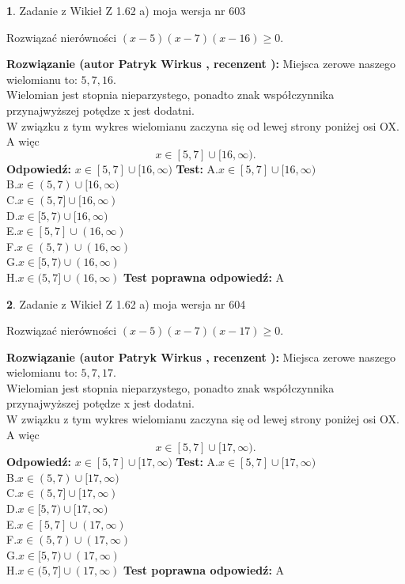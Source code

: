 \documentclass[12pt, a4paper]{article}
\theoremstyle{definition} %
\newtheorem{zad}{}
\newcommand{\zadStart}[1]{\begin{zad}#1\newline}
\newcommand{\zadStop}{\end{zad}}
\newcommand{\rozwStart}[2]{\noindent \textbf{Rozwiązanie (autor #1 , recenzent #2): }\newline}
\newcommand{\rozwStop}{\newline}
\newcommand{\odpStart}{\noindent \textbf{Odpowiedź:}\newline}
\newcommand{\odpStop}{\newline}
\newcommand{\testStart}{\noindent \textbf{Test:}\newline}
\newcommand{\testStop}{\newline}
\newcommand{\kluczStart}{\noindent \textbf{Test poprawna odpowiedź:}\newline}
\newcommand{\kluczStop}{\newline}
\begin{document}
\zadStart{Zadanie z Wikieł Z 1.62 a) moja wersja nr 603}

Rozwiązać nierówności $(x-5)(x-7)(x-16)\ge0$.
\zadStop
\rozwStart{Patryk Wirkus}{}
Miejsca zerowe naszego wielomianu to: $5, 7, 16$.\\
Wielomian jest stopnia nieparzystego, ponadto znak współczynnika przy\linebreak najwyższej potędze x jest dodatni.\\ W związku z tym wykres wielomianu zaczyna się od lewej strony poniżej osi OX. A więc $$x \in [5,7] \cup [16,\infty).$$
\rozwStop
\odpStart
$x \in [5,7] \cup [16,\infty)$
\odpStop
\testStart
A.$x \in [5,7] \cup [16,\infty)$\\
B.$x \in (5,7) \cup [16,\infty)$\\
C.$x \in (5,7] \cup [16,\infty)$\\
D.$x \in [5,7) \cup [16,\infty)$\\
E.$x \in [5,7] \cup (16,\infty)$\\
F.$x \in (5,7) \cup (16,\infty)$\\
G.$x \in [5,7) \cup (16,\infty)$\\
H.$x \in (5,7] \cup (16,\infty)$
\testStop
\kluczStart
A
\kluczStop



\zadStart{Zadanie z Wikieł Z 1.62 a) moja wersja nr 604}

Rozwiązać nierówności $(x-5)(x-7)(x-17)\ge0$.
\zadStop
\rozwStart{Patryk Wirkus}{}
Miejsca zerowe naszego wielomianu to: $5, 7, 17$.\\
Wielomian jest stopnia nieparzystego, ponadto znak współczynnika przy\linebreak najwyższej potędze x jest dodatni.\\ W związku z tym wykres wielomianu zaczyna się od lewej strony poniżej osi OX. A więc $$x \in [5,7] \cup [17,\infty).$$
\rozwStop
\odpStart
$x \in [5,7] \cup [17,\infty)$
\odpStop
\testStart
A.$x \in [5,7] \cup [17,\infty)$\\
B.$x \in (5,7) \cup [17,\infty)$\\
C.$x \in (5,7] \cup [17,\infty)$\\
D.$x \in [5,7) \cup [17,\infty)$\\
E.$x \in [5,7] \cup (17,\infty)$\\
F.$x \in (5,7) \cup (17,\infty)$\\
G.$x \in [5,7) \cup (17,\infty)$\\
H.$x \in (5,7] \cup (17,\infty)$
\testStop
\kluczStart
A
\kluczStop
\end{document}
